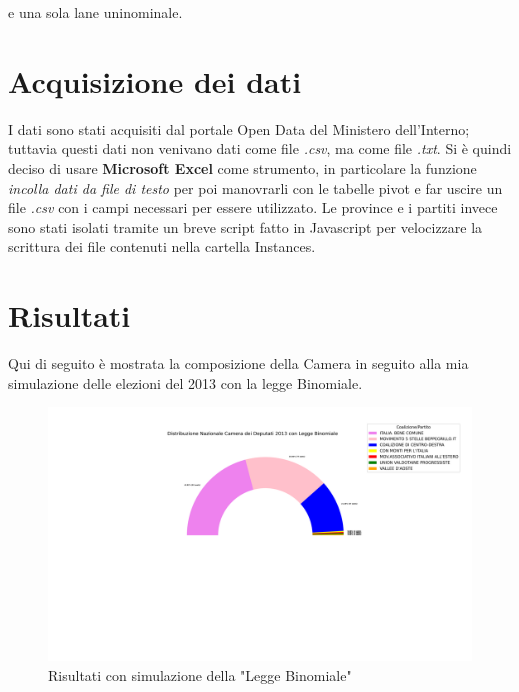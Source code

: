 \documentclass{article}
\begin{document}
e una sola lane uninominale.
\newline \newline



\section{Acquisizione dei dati}
I dati sono stati acquisiti dal portale Open Data del Ministero dell'Interno; tuttavia questi dati non venivano dati come file \textit{.csv}, ma come file \textit{.txt}. Si è quindi deciso di usare \textbf{Microsoft Excel} come strumento, in particolare la funzione \textit{incolla dati da file di testo} per poi manovrarli con le tabelle pivot e far uscire un file \textit{.csv} con i campi necessari per essere utilizzato.\newline \newline
Le province e i partiti invece sono stati isolati tramite un breve script fatto in Javascript per velocizzare la scrittura dei file contenuti nella cartella Instances.



\newpage
\section{Risultati}

Qui di seguito è mostrata la composizione della Camera in seguito alla mia simulazione delle elezioni del 2013 con la legge Binomiale.

\begin{figure}[h]
    \centering
    \includegraphics[scale=0.45]{binomiale.png}
    \caption{Risultati con simulazione della "Legge Binomiale"}
    \label{fig:binomiale}
\end{figure}
\end{document}
